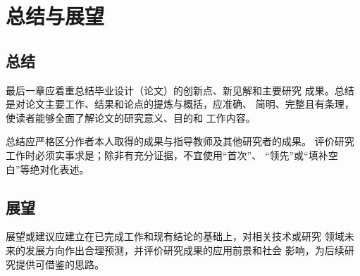 \chapter{总结与展望}

\section{总结}

最后一章应着重总结毕业设计（论文）的创新点、新见解和主要研究
成果。总结是对论文主要工作、结果和论点的提炼与概括，应准确、
简明、完整且有条理，使读者能够全面了解论文的研究意义、目的和
工作内容。

总结应严格区分作者本人取得的成果与指导教师及其他研究者的成果。
评价研究工作时必须实事求是；除非有充分证据，不宜使用“首次”、
“领先”或“填补空白”等绝对化表述。

\section{展望}

展望或建议应建立在已完成工作和现有结论的基础上，对相关技术或研究
领域未来的发展方向作出合理预测，并评价研究成果的应用前景和社会
影响，为后续研究提供可借鉴的思路。
